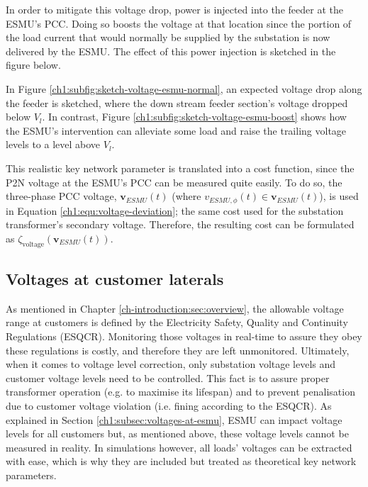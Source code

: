 In order to mitigate this voltage drop, power is injected into the feeder at the ESMU's PCC.
Doing so boosts the voltage at that location since the portion of the load current that would normally be supplied by the substation is now delivered by the ESMU.
The effect of this power injection is sketched in the figure below.




In Figure \ref{ch1:subfig:sketch-voltage-esmu-normal}, an expected voltage drop along the feeder is sketched, where the down stream feeder section's voltage dropped below $V_l$.
In contrast, Figure \ref{ch1:subfig:sketch-voltage-esmu-boost} shows how the ESMU's intervention can alleviate some load and raise the trailing voltage levels to a level above $V_l$.

This realistic key network parameter is translated into a cost function, since the P2N voltage at the ESMU's PCC can be measured quite easily.
To do so, the three-phase PCC voltage, $\textbf{v}_{ESMU}(t)$ (where $v_{ESMU,\phi}(t) \in \textbf{v}_{ESMU}(t)$), is used in Equation \ref{ch1:equ:voltage-deviation}; the same cost used for the substation transformer's secondary voltage.
Therefore, the resulting cost can be formulated as $\zeta_\text{voltage}(\textbf{v}_{ESMU}(t))$.

\subsection{Voltages at customer laterals}
\label{ch1:subsec:voltages-at-customers}

As mentioned in Chapter \ref{ch-introduction:sec:overview}, the allowable voltage range at customers is defined by the Electricity Safety, Quality and Continuity Regulations (ESQCR).
Monitoring those voltages in real-time to assure they obey these regulations is costly, and therefore they are left unmonitored.
Ultimately, when it comes to voltage level correction, only substation voltage levels and customer voltage levels need to be controlled.
This fact is to assure proper transformer operation (e.g. to maximise its lifespan) and to prevent penalisation due to customer voltage violation (i.e. fining according to the ESQCR).
As explained in Section \ref{ch1:subsec:voltages-at-esmu}, ESMU can impact voltage levels for all customers but, as mentioned above, these voltage levels cannot be measured in reality.
In simulations however, all loads' voltages can be extracted with ease, which is why they are included but treated as theoretical key network parameters.

